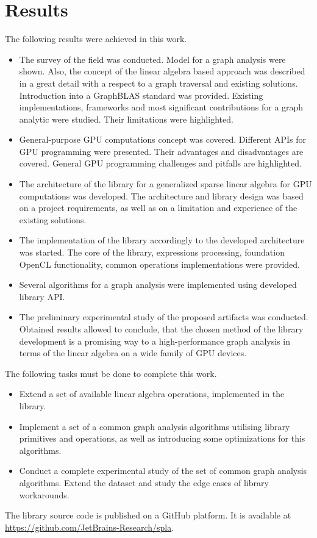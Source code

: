 \section{Results}

The following results were achieved in this work.

\begin{itemize}
    \item The survey of the field was conducted. Model for a graph analysis were shown. Also, the concept of the linear algebra based approach was described in a great detail with a respect to a graph traversal and existing solutions. Introduction into a GraphBLAS standard was provided. Existing implementations, frameworks and most significant contributions for a graph analytic were studied. Their limitations were highlighted. 
    
    \item General-purpose GPU computations concept was covered. Different APIs for GPU programming were presented. Their advantages and disadvantages are covered. General GPU programming challenges and pitfalls are highlighted. 
    
    \item The architecture of the library for a generalized sparse linear algebra for GPU computations was developed. The architecture and library design was based on a project requirements, as well as on a limitation and experience of the existing solutions. 
    
    \item The implementation of the library accordingly to the developed architecture was started. The core of the library, expressions processing, foundation OpenCL functionality, common operations implementations were provided.
    
    \item Several algorithms for a graph analysis were implemented using developed library API.
    
    \item The preliminary experimental study of the proposed artifacts was conducted. Obtained results allowed to conclude, that the chosen method of the library development is a promising way to a high-performance graph analysis in terms of the linear algebra on a wide family of GPU devices. 
\end{itemize}

The following tasks must be done to complete this work.

\begin{itemize}
    \item Extend a set of available linear algebra operations, implemented in the library.

    \item Implement a set of a common graph analysis algorithms utilising library primitives and operations, as well as introducing some optimizations  for this algorithms.
    
    \item Conduct a complete experimental study of the set of common graph analysis algorithms. Extend the dataset and study the edge cases of library workarounds.
\end{itemize}

The library source code is published on a GitHub platform. It is available at \url{https://github.com/JetBrains-Research/spla}.
